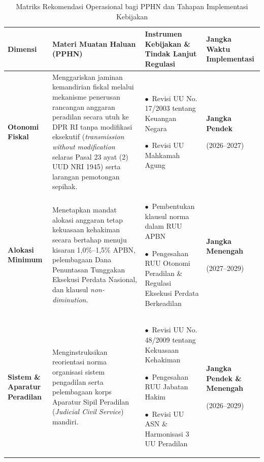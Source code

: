\documentclass[12pt,a4paper,twocolumn]{article}
\begin{document}
\begin{table}[t]
    \centering
    \caption{Matriks Rekomendasi Operasional bagi PPHN dan Tahapan Implementasi Kebijakan}
    \label{tab:rekomendasi_pphn}
    \footnotesize
    \renewcommand{\arraystretch}{1.12}
    \begin{tabularx}{\textwidth}{@{} >{\raggedright\arraybackslash}p{2.4cm} >{\raggedright\arraybackslash}X >{\raggedright\arraybackslash}p{4.6cm} >{\centering\arraybackslash}p{2.4cm} @{}}
        \toprule
        \textbf{Dimensi}                      & \textbf{Materi Muatan Haluan (PPHN)}                                                                                                                        & \textbf{Instrumen Kebijakan \& Tindak Lanjut Regulasi}                                                                                                                                     & \textbf{Jangka Waktu Implementasi}                  \\
        \midrule
        \textbf{Otonomi Fiskal}               & Menggariskan jaminan kemandirian fiskal melalui mekanisme penerusan rancangan anggaran peradilan secara utuh ke DPR RI tanpa modifikasi eksekutif (\textit{transmission without modification} selaras Pasal 23 ayat (2) UUD NRI 1945) serta larangan pemotongan sepihak. & $\bullet$~Revisi UU No. 17/2003 tentang Keuangan Negara \par\vspace{2pt} $\bullet$~Revisi UU Mahkamah Agung & \textbf{Jangka Pendek}\par (2026--2027) \\
        \addlinespace[4pt]
        \textbf{Alokasi Minimum}              & Menetapkan mandat alokasi anggaran tetap kekuasaan kehakiman secara bertahap menuju kisaran 1,0\%--1,5\% APBN, pelembagaan Dana Penuntasan Tunggakan Eksekusi Perdata Nasional, dan klausul \textit{non-diminution}. & $\bullet$~Pembentukan klausul norma dalam RUU APBN \par\vspace{2pt} $\bullet$~Pengesahan RUU Otonomi Peradilan \& Regulasi Eksekusi Perdata Berkeadilan & \textbf{Jangka Menengah}\par (2027--2029)           \\
        \addlinespace[4pt]
        \textbf{Sistem \& Aparatur Peradilan} & Menginstruksikan reorientasi norma organisasi sistem pengadilan serta pelembagaan korps Aparatur Sipil Peradilan (\textit{Judicial Civil Service}) mandiri. & $\bullet$~Revisi UU No. 48/2009 tentang Kekuasaan Kehakiman \par\vspace{2pt} $\bullet$~Pengesahan RUU Jabatan Hakim \par\vspace{2pt} $\bullet$~Revisi UU ASN \& Harmonisasi 3 UU Peradilan & \textbf{Jangka Pendek \& Menengah}\par (2026--2029) \\

\end{tabularx}
\end{table}
\end{document}

